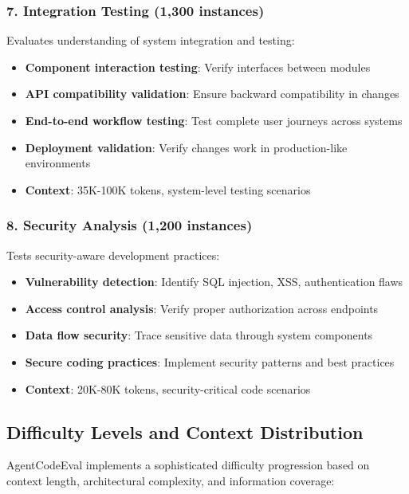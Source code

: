 \documentclass{article}
\begin{document}
\subsubsection{7. Integration Testing (1,300 instances)}
Evaluates understanding of system integration and testing:
\begin{itemize}
    \item \textbf{Component interaction testing}: Verify interfaces between modules
    \item \textbf{API compatibility validation}: Ensure backward compatibility in changes
    \item \textbf{End-to-end workflow testing}: Test complete user journeys across systems
    \item \textbf{Deployment validation}: Verify changes work in production-like environments
    \item \textbf{Context}: 35K-100K tokens, system-level testing scenarios
\end{itemize}

\subsubsection{8. Security Analysis (1,200 instances)}
Tests security-aware development practices:
\begin{itemize}
    \item \textbf{Vulnerability detection}: Identify SQL injection, XSS, authentication flaws
    \item \textbf{Access control analysis}: Verify proper authorization across endpoints
    \item \textbf{Data flow security}: Trace sensitive data through system components
    \item \textbf{Secure coding practices}: Implement security patterns and best practices
    \item \textbf{Context}: 20K-80K tokens, security-critical code scenarios
\end{itemize}

\subsection{Difficulty Levels and Context Distribution}

AgentCodeEval implements a sophisticated difficulty progression based on context length, architectural complexity, and information coverage:
\end{document}
